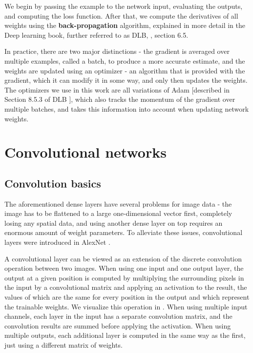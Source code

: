 We begin by passing the example to the network input, evaluating the outputs, and computing the loss function. After that, we compute the derivatives of all weights using the \textbf{back-propagation} algorithm, explained in more detail in the Deep learning book, further referred to as DLB, \citep{deep_learning_book}, section 6.5.

In practice, there are two major distinctions - the gradient is averaged over multiple examples, called a batch, to produce a more accurate estimate, and the weights are updated using an optimizer - an algorithm that is provided with the gradient, which it can modify it in some way, and only then updates the weights. The optimizers we use in this work are all variations of Adam [described in Section 8.5.3 of DLB \citep{deep_learning_book}], which also tracks the momentum of the gradient over multiple batches, and takes this information into account when updating network weights.


\section{Convolutional networks}

\subsection{Convolution basics}

The aforementioned dense layers have several problems for image data - the image has to be flattened to a large one-dimensional vector first, completely losing any spatial data, and using another dense layer on top requires an enormous amount of weight parameters. To alleviate these issues, convolutional layers were introduced in AlexNet \citep{alex_net}.

A convolutional layer can be viewed as an extension of the discrete convolution operation between two images. When using one input and one output layer, the output at a given position is computed by multiplying the surrounding pixels in the input by a convolutional matrix and applying an activation to the result, the values of which are the same for every position in the output and which represent the trainable weights. We visualize this operation in . When using multiple input channels, each layer in the input has a separate convolution matrix, and the convolution results are summed before applying the activation. When using multiple outputs, each additional layer is computed in the same way as the first, just using a different matrix of weights.


